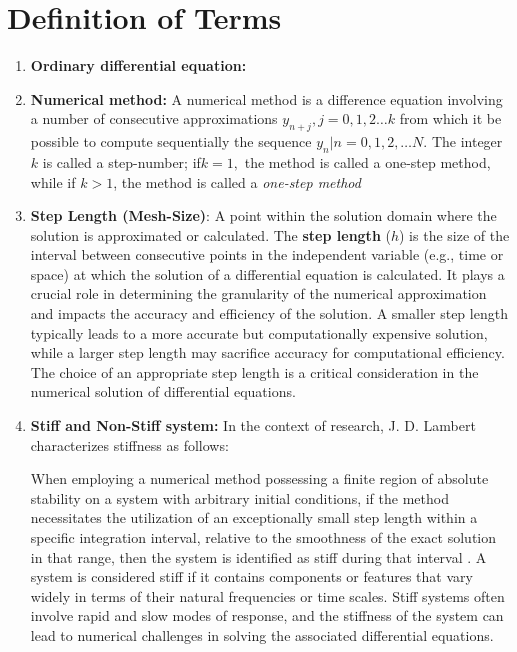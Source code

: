 \section{Definition of Terms}
\begin{enumerate}
  \item \textbf{Ordinary differential equation:}
  \item \textbf{Numerical method:} A numerical method is a difference equation involving a number of consecutive approximations $y_{n+j}, j = 0,1,2 \dots k$ from which it be possible to compute sequentially the sequence ${y_{n}|n = 0,1,2, \dots N}$. The integer $k$ is called a step-number; if$k=1,$ the method is called a one-step method, while if $k>1$, the method is called a \textit{one-step method}
  
  \item \textbf{Step Length (Mesh-Size)}: A point within the solution domain where the solution is approximated or calculated. The \textbf{step length} (\(h\)) is the size of the interval between consecutive points in the independent variable (e.g., time or space) at which the solution of a differential equation is calculated. It plays a crucial role in determining the granularity of the numerical approximation and impacts the accuracy and efficiency of the solution. A smaller step length typically leads to a more accurate but computationally expensive solution, while a larger step length may sacrifice accuracy for computational efficiency. The choice of an appropriate step length is a critical consideration in the numerical solution of differential equations.
  
  \item \textbf{Stiff and Non-Stiff system:} 
  In the context of research, J. D. Lambert characterizes stiffness as follows:

  When employing a numerical method possessing a finite region of absolute stability on a system with arbitrary initial conditions, if the method necessitates the utilization of an exceptionally small step length within a specific integration interval, relative to the smoothness of the exact solution in that range, then the system is identified as stiff during that interval \cite{lambert1977}.
  A system is considered stiff if it contains components or features that vary widely in terms of their natural frequencies or time scales. Stiff systems often involve rapid and slow modes of response, and the stiffness of the system can lead to numerical challenges in solving the associated differential equations.



\end{enumerate}
